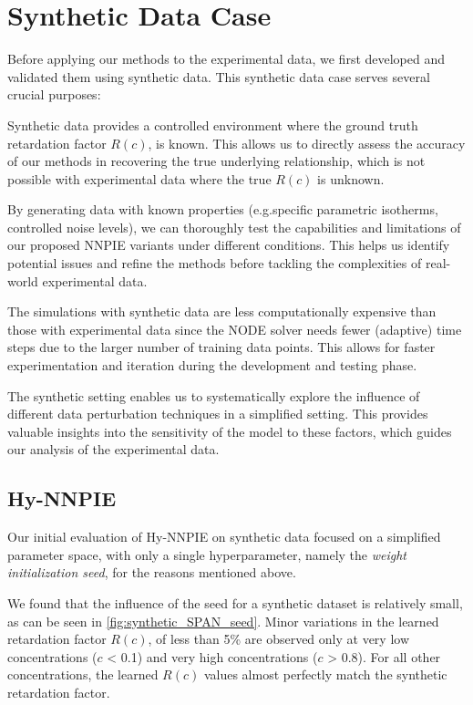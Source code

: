 \section{Synthetic Data Case}
Before applying our methods to the experimental data, we first developed and validated them using synthetic data. This synthetic data case serves several crucial purposes:
\begin{enumerate*}
    \item Synthetic data provides a controlled environment where the ground truth retardation factor $R(c)$, is known. This allows us to directly assess the accuracy of our methods in recovering the true underlying relationship, which is not possible with experimental data where the true $R(c)$ is unknown.
    \item By generating data with known properties (e.g.\@ specific parametric isotherms, controlled noise levels), we can thoroughly test the capabilities and limitations of our proposed NNPIE variants under different conditions. This helps us identify potential issues and refine the methods before tackling the complexities of real-world experimental data.
    \item The simulations with synthetic data are less computationally expensive than those with experimental data since the NODE solver needs fewer (adaptive) time steps due to the larger number of training data points. This allows for faster experimentation and iteration during the development and testing phase.
    \item The synthetic setting enables us to systematically explore the influence of different data perturbation techniques in a simplified setting. This provides valuable insights into the sensitivity of the model to these factors, which guides our analysis of the experimental data.
\end{enumerate*}

\subsection{Hy-NNPIE}
Our initial evaluation of Hy-NNPIE on synthetic data focused on a simplified parameter space, with only a single hyperparameter, namely the \textit{weight initialization seed}, for the reasons mentioned above.

We found that the influence of the seed for a synthetic dataset is relatively small, as can be seen in \cref{fig:synthetic_SPAN_seed}. Minor variations in the learned retardation factor $R(c)$, of less than 5\% are observed only at very low concentrations ($c$ < 0.1) and very high concentrations ($c$ > 0.8). For all other concentrations, the learned $R(c)$ values almost perfectly match the synthetic retardation factor.


